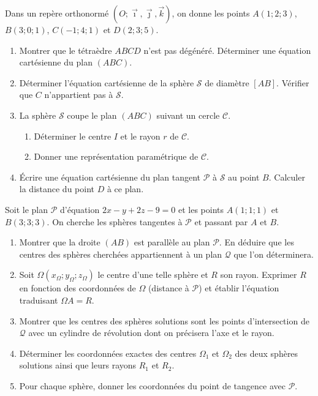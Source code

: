 \documentclass[11pt]{article}
\begin{document}
\begin{exercice}
Dans un repère orthonormé $(O;\vec{\imath},\vec{\jmath},\vec{k})$, on donne les points $A(1;2;3)$, $B(3;0;1)$, $C(-1;4;1)$ et $D(2;3;5)$.
\begin{enumerate}
    \item Montrer que le tétraèdre $ABCD$ n'est pas dégénéré. Déterminer une équation cartésienne du plan $(ABC)$.
    \item Déterminer l'équation cartésienne de la sphère $\mathcal{S}$ de diamètre $[AB]$. Vérifier que $C$ n'appartient pas à $\mathcal{S}$.
    \item La sphère $\mathcal{S}$ coupe le plan $(ABC)$ suivant un cercle $\mathcal{C}$.
    \begin{enumerate}
        \item Déterminer le centre $I$ et le rayon $r$ de $\mathcal{C}$.
        \item Donner une représentation paramétrique de $\mathcal{C}$.
    \end{enumerate}
    \item Écrire une équation cartésienne du plan tangent $\mathcal{P}$ à $\mathcal{S}$ au point $B$. Calculer la distance du point $D$ à ce plan.
\end{enumerate}
\end{exercice}

\begin{exercice}
Soit le plan $\mathcal{P}$ d'équation $2x - y + 2z - 9 = 0$ et les points $A(1;1;1)$ et $B(3;3;3)$.
On cherche les sphères tangentes à $\mathcal{P}$ et passant par $A$ et $B$.
\begin{enumerate}
    \item Montrer que la droite $(AB)$ est parallèle au plan $\mathcal{P}$. En déduire que les centres des sphères cherchées appartiennent à un plan $\mathcal{Q}$ que l'on déterminera.
    \item Soit $\Omega(x_\Omega; y_\Omega; z_\Omega)$ le centre d'une telle sphère et $R$ son rayon. Exprimer $R$ en fonction des coordonnées de $\Omega$ (distance à $\mathcal{P}$) et établir l'équation traduisant $\Omega A = R$.
    \item Montrer que les centres des sphères solutions sont les points d'intersection de $\mathcal{Q}$ avec un cylindre de révolution dont on précisera l'axe et le rayon.
    \item Déterminer les coordonnées exactes des centres $\Omega_1$ et $\Omega_2$ des deux sphères solutions ainsi que leurs rayons $R_1$ et $R_2$.
    \item Pour chaque sphère, donner les coordonnées du point de tangence avec $\mathcal{P}$.
\end{enumerate}
\end{exercice}
\end{document}

